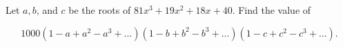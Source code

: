 Let $a, b$, and $c$ be the roots of $81x^3 + 19x^2 + 18x + 40$. Find the value of

\[1000(1 - a + a^2 - a^3 +... )(1 - b + b^2 - b^3 + ...)(1 - c + c^2 -c^3 +... ).\]
